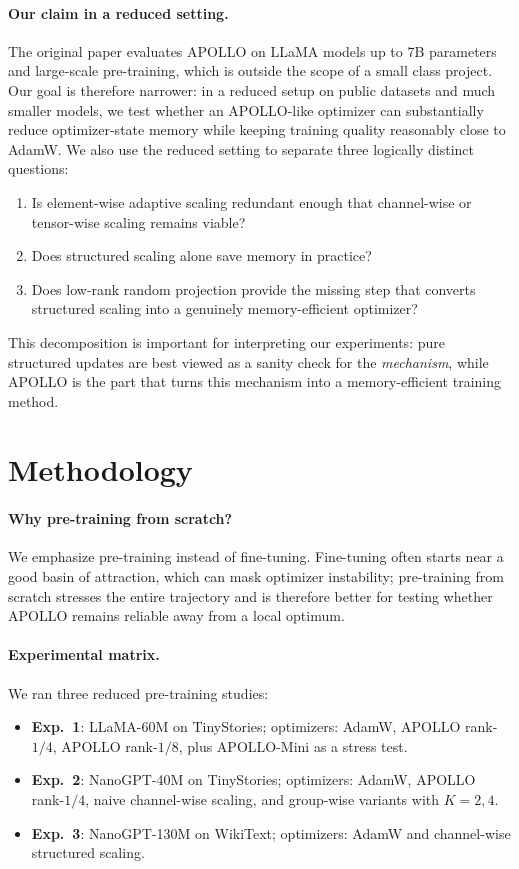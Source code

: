 \documentclass[10pt]{article}
\begin{document}
\paragraph{Our claim in a reduced setting.}
The original paper evaluates APOLLO on LLaMA models up to 7B parameters and large-scale pre-training, which is outside the scope of a small class project. Our goal is therefore narrower: in a reduced setup on public datasets and much smaller models, we test whether an APOLLO-like optimizer can substantially reduce optimizer-state memory while keeping training quality reasonably close to AdamW. We also use the reduced setting to separate three logically distinct questions:
\begin{enumerate}[leftmargin=1.5em]
  \item Is element-wise adaptive scaling redundant enough that channel-wise or tensor-wise scaling remains viable?
  \item Does structured scaling alone save memory in practice?
  \item Does low-rank random projection provide the missing step that converts structured scaling into a genuinely memory-efficient optimizer?
\end{enumerate}
This decomposition is important for interpreting our experiments: pure structured updates are best viewed as a sanity check for the \emph{mechanism}, while APOLLO is the part that turns this mechanism into a memory-efficient training method.
\fi

\section{Methodology}
\paragraph{Why pre-training from scratch?}
We emphasize pre-training instead of fine-tuning. Fine-tuning often starts near a good basin of attraction, which can mask optimizer instability; pre-training from scratch stresses the entire trajectory and is therefore better for testing whether APOLLO remains reliable away from a local optimum.

\paragraph{Experimental matrix.}
We ran three reduced pre-training studies:
\begin{itemize}
  \item \textbf{Exp.~1}: LLaMA-60M on TinyStories; optimizers: AdamW, APOLLO rank-$1/4$, APOLLO rank-$1/8$, plus APOLLO-Mini as a stress test.
  \item \textbf{Exp.~2}: NanoGPT-40M on TinyStories; optimizers: AdamW, APOLLO rank-$1/4$, naive channel-wise scaling, and group-wise variants with $K=2,4$.
  \item \textbf{Exp.~3}: NanoGPT-130M on WikiText; optimizers: AdamW and channel-wise structured scaling.
\end{itemize}
\end{document}
